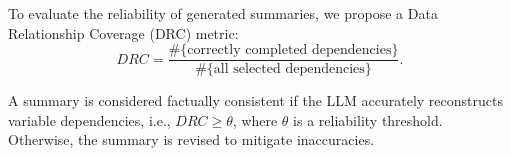 To evaluate the reliability of generated summaries, we propose a Data Relationship Coverage (DRC) metric:
\begin{equation}
DRC = \frac{\#\{\text{correctly completed dependencies}\}}{\#\{\text{all selected dependencies}\}}.
\end{equation}

A summary is considered factually consistent if the LLM accurately reconstructs variable dependencies, i.e., $DRC \ge \theta$, where $\theta$ is a reliability threshold. Otherwise, the summary is revised to mitigate inaccuracies.






